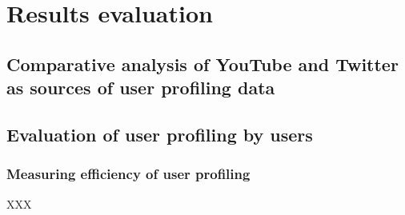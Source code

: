 \section{Results evaluation}

\subsection{Comparative analysis of YouTube and Twitter as sources of user
profiling data}

\subsection{Evaluation of user profiling by users}
\subsubsection{Measuring efficiency of user profiling}
XXX
